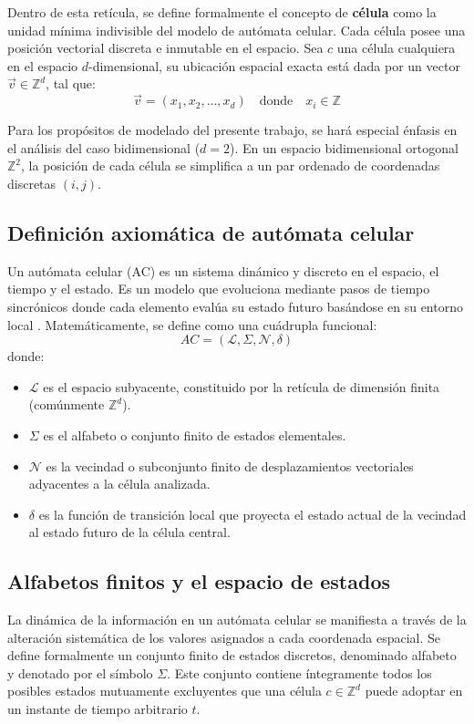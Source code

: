 Dentro de esta retícula, se define formalmente el concepto de \textbf{célula} como la unidad mínima indivisible del modelo de autómata celular. Cada célula posee una posición vectorial discreta e inmutable en el espacio. Sea $c$ una célula cualquiera en el espacio $d$-dimensional, su ubicación espacial exacta está dada por un vector $\vec{v} \in \mathbb{Z}^d$, tal que:
\begin{equation}
    \vec{v} = (x_1, x_2, \dots, x_d) \quad \text{donde} \quad x_i \in \mathbb{Z}
\end{equation}

Para los propósitos de modelado del presente trabajo, se hará especial énfasis en el análisis del caso bidimensional ($d = 2$). En un espacio bidimensional ortogonal $\mathbb{Z}^2$, la posición de cada célula se simplifica a un par ordenado de coordenadas discretas $(i, j)$. 

\subsection{Definición axiomática de autómata celular}
Un autómata celular (AC) es un sistema dinámico y discreto en el espacio, el tiempo y el estado. Es un modelo que evoluciona mediante pasos de tiempo sincrónicos donde cada elemento evalúa su estado futuro basándose en su entorno local \cite{Wolfram2002}. Matemáticamente, se define como una cuádrupla funcional:
\begin{equation}
    AC = (\mathcal{L}, \Sigma, \mathcal{N}, \delta)
\end{equation}
donde:
\begin{itemize}
    \item $\mathcal{L}$ es el espacio subyacente, constituido por la retícula de dimensión finita (comúnmente $\mathbb{Z}^d$).
    \item $\Sigma$ es el alfabeto o conjunto finito de estados elementales.
    \item $\mathcal{N}$ es la vecindad o subconjunto finito de desplazamientos vectoriales adyacentes a la célula analizada.
    \item $\delta$ es la función de transición local que proyecta el estado actual de la vecindad al estado futuro de la célula central.
\end{itemize}

\subsection{Alfabetos finitos y el espacio de estados}
La dinámica de la información en un autómata celular se manifiesta a través de la alteración sistemática de los valores asignados a cada coordenada espacial. Se define formalmente un conjunto finito de estados discretos, denominado alfabeto y denotado por el símbolo $\Sigma$. Este conjunto contiene íntegramente todos los posibles estados mutuamente excluyentes que una célula $c \in \mathbb{Z}^d$ puede adoptar en un instante de tiempo arbitrario $t$.

